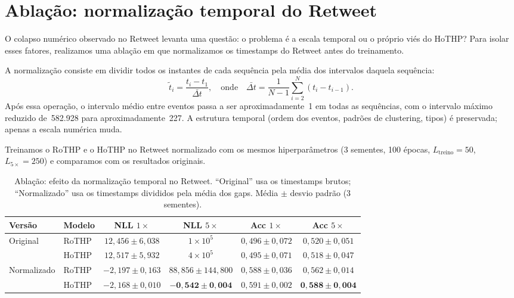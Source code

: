 \section{Ablação: normalização temporal do Retweet}
\label{sec:ablacao-retweet}

O colapso numérico observado no Retweet levanta uma questão: o problema é a escala temporal ou o próprio viés do HoTHP? Para isolar esses fatores, realizamos uma ablação em que normalizamos os timestamps do Retweet antes do treinamento.

A normalização consiste em dividir todos os instantes de cada sequência pela média dos intervalos daquela sequência:
%
\begin{equation}
    \tilde{t}_i = \frac{t_i - t_1}{\bar{\Delta t}}, \quad \text{onde} \quad \bar{\Delta t} = \frac{1}{N-1} \sum_{i=2}^{N} (t_i - t_{i-1}).
    \label{eq:normalizacao-retweet}
\end{equation}
%
Após essa operação, o intervalo médio entre eventos passa a ser aproximadamente~1 em todas as sequências, com o intervalo máximo reduzido de~582.928 para aproximadamente~227. A estrutura temporal (ordem dos eventos, padrões de clustering, tipos) é preservada; apenas a escala numérica muda.

Treinamos o RoTHP e o HoTHP no Retweet normalizado com os mesmos hiperparâmetros (3 sementes, 100 épocas, $L_{\text{treino}} = 50$, $L_{5\times} = 250$) e comparamos com os resultados originais.

\begin{table}[h!]
\centering
\caption{Ablação: efeito da normalização temporal no Retweet. ``Original'' usa os timestamps brutos; ``Normalizado'' usa os timestamps divididos pela média dos gaps. Média $\pm$ desvio padrão (3 sementes).}
\label{tab:ablacao-retweet}
\begin{tabular}{llcccc}
\toprule
Versão & Modelo & NLL $1\times$ & NLL $5\times$ & Acc $1\times$ & Acc $5\times$ \\
\midrule
\multirow{2}{*}{Original}
    & RoTHP  & $12{,}456 \pm 6{,}038$ & $1 \times 10^{5}$ & $0{,}496 \pm 0{,}072$ & $0{,}520 \pm 0{,}051$ \\
    & HoTHP  & $12{,}517 \pm 5{,}932$ & $4 \times 10^{5}$ & $0{,}495 \pm 0{,}071$ & $0{,}518 \pm 0{,}047$ \\
\midrule
\multirow{2}{*}{Normalizado}
    & RoTHP  & $-2{,}197 \pm 0{,}163$ & $88{,}856 \pm 144{,}800$ & $0{,}588 \pm 0{,}036$ & $0{,}562 \pm 0{,}014$ \\
    & HoTHP  & $-2{,}168 \pm 0{,}010$ & $\mathbf{-0{,}542 \pm 0{,}004}$ & $0{,}591 \pm 0{,}002$ & $\mathbf{0{,}588 \pm 0{,}004}$ \\
\bottomrule
\end{tabular}
\end{table}


